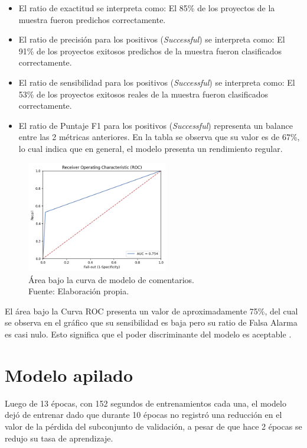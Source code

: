 \begin{itemize}
	\item El ratio de exactitud se interpreta como: El 85\% de los proyectos de la muestra fueron predichos correctamente.
	\item El ratio de precisión para los positivos (\textit{Successful}) se interpreta como: El 91\% de los proyectos exitosos predichos de la muestra fueron clasificados correctamente. 
	\item El ratio de sensibilidad para los positivos (\textit{Successful}) se interpreta como: El 53\% de los proyectos exitosos reales de la muestra fueron clasificados correctamente.
	\item El ratio de Puntaje F1 para los positivos (\textit{Successful}) representa un balance entre las 2 métricas anteriores. En la tabla se observa que su valor es de 67\%, lo cual indica que en general, el modelo presenta un rendimiento regular.
\end{itemize}

\begin{figure}[!ht]
	\begin{center}
		\includegraphics[width=0.55\textwidth]{5/figures/comments_auc.png}
		\caption[Área bajo la curva de modelo de comentarios]{Área bajo la curva de modelo de comentarios.\\
		Fuente: Elaboración propia.}
		\label{5:fig9}
	\end{center}
\end{figure}

El área bajo la Curva ROC presenta un valor de aproximadamente 75\%, del cual se observa en el gráfico que su sensibilidad es baja pero su ratio de Falsa Alarma es casi nulo. Esto significa que el poder discriminante del modelo es aceptable \parencite{bk_britos2006datamining}.

\section{Modelo apilado}
Luego de 13 épocas, con 152 segundos de entrenamientos cada una, el modelo dejó de entrenar dado que durante 10 épocas no registró una reducción en el valor de la pérdida del subconjunto de validación, a pesar de que hace 2 épocas se redujo su tasa de aprendizaje.

